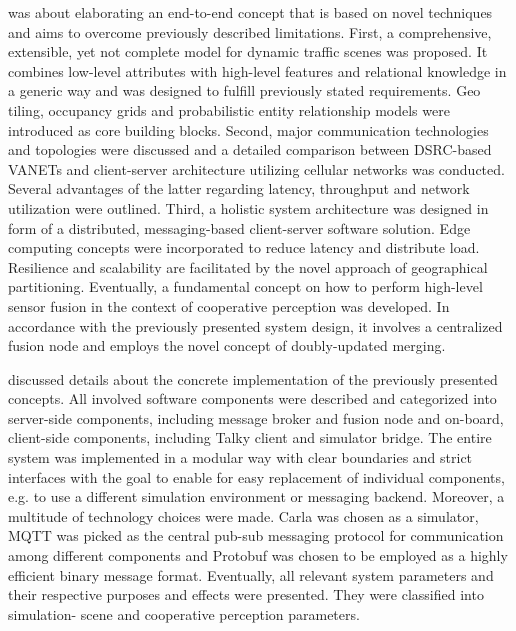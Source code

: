  was about elaborating an end-to-end concept that is based on novel techniques and aims to overcome previously described limitations. First, a comprehensive, extensible, yet not complete model for dynamic traffic scenes was proposed. It combines low-level attributes with high-level features and relational knowledge in a generic way and was designed to fulfill previously stated requirements. Geo tiling, occupancy grids and probabilistic entity relationship models were introduced as core building blocks.
Second, major communication technologies and topologies were discussed and a detailed comparison between DSRC-based VANETs and client-server architecture utilizing cellular networks was conducted. Several advantages of the latter regarding latency, throughput and network utilization were outlined.
Third, a holistic system architecture was designed in form of a distributed, messaging-based client-server software solution. Edge computing concepts were incorporated to reduce latency and distribute load. Resilience and scalability are facilitated by the novel approach of geographical partitioning.
Eventually, a fundamental concept on how to perform high-level sensor fusion in the context of cooperative perception was developed. In accordance with the previously presented system design, it involves a centralized fusion node and employs the novel concept of doubly-updated merging. 
\par
\bigskip

 discussed details about the concrete implementation of the previously presented concepts. All involved software components were described and categorized into server-side components, including message broker and fusion node and on-board, client-side components, including Talky client and simulator bridge. The entire system was implemented in a modular way with clear boundaries and strict interfaces with the goal to enable for easy replacement of individual components, e.g. to use a different simulation environment or messaging backend. Moreover, a multitude of technology choices were made. Carla was chosen as a simulator, MQTT was picked as the central pub-sub messaging protocol for communication among different components and Protobuf was chosen to be employed as a highly efficient binary message format. Eventually, all relevant system parameters and their respective purposes and effects were presented. They were classified into simulation- scene and cooperative perception parameters. 
\par
\bigskip

